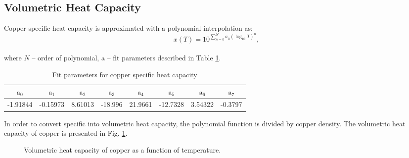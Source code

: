 \subsection{Volumetric Heat Capacity}
Copper specific heat capacity is approximated with a polynomial interpolation as: 
\begin{equation}
    x(T) = 10^{\sum_{n=0}^{N} a_\text{n}(\log_\text{10}T)^{n}},
\end{equation}
\\
where $N$ -- order of polynomial, a -- fit parameters described in Table \ref{table:nist_cu_cp_parameters}. 

\begin{table}[H]
    \caption{Fit parameters for copper specific heat capacity} 
    \vspace{-1.em} 
    \fontsize{10}{10}
    \selectfont 
    \renewcommand{\arraystretch}{1.5}
    \begin{center}
    \begin{tabular}{ cccccccc }  
    $\text{a}_0$ & $\text{a}_1$ & $\text{a}_2$ & $\text{a}_3$ & $\text{a}_4$ & $\text{a}_5$ & $\text{a}_6$ & $\text{a}_7$ \\
    \hline
    -1.91844 & -0.15973 & 8.61013 & -18.996 & 21.9661 & -12.7328 & 3.54322 & -0.3797 \\
    \hline 
    \end{tabular}
    \end{center}  
     \label{table:nist_cu_cp_parameters} 
 \end{table}
 
In order to convert specific into volumetric heat capacity, the polynomial function is divided by copper density. The volumetric heat capacity of copper is presented in Fig. \ref{fig:cu_cv_plot}.

\begin{figure}[H]
\centering
{}
    \caption{Volumetric heat capacity of copper as a function of temperature.}
    \label{fig:cu_cv_plot}
\end{figure}